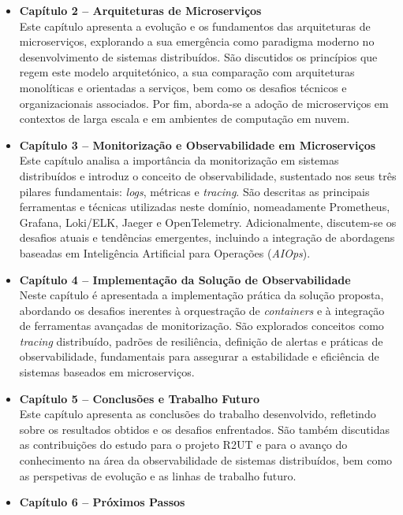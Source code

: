 \begin{itemize}
    \item \textbf{Capítulo 2 – Arquiteturas de Microserviços} \\
    Este capítulo apresenta a evolução e os fundamentos das arquiteturas de microserviços, explorando a sua emergência como paradigma moderno no desenvolvimento de sistemas distribuídos. São discutidos os princípios que regem este modelo arquitetónico, a sua comparação com arquiteturas monolíticas e orientadas a serviços, bem como os desafios técnicos e organizacionais associados. Por fim, aborda-se a adoção de microserviços em contextos de larga escala e em ambientes de computação em nuvem.

    \item \textbf{Capítulo 3 – Monitorização e Observabilidade em Microserviços} \\
    Este capítulo analisa a importância da monitorização em sistemas distribuídos e introduz o conceito de observabilidade, sustentado nos seus três pilares fundamentais: \textit{logs}, métricas e \textit{tracing}. São descritas as principais ferramentas e técnicas utilizadas neste domínio, nomeadamente Prometheus, Grafana, Loki/ELK, Jaeger e OpenTelemetry. Adicionalmente, discutem-se os desafios atuais e tendências emergentes, incluindo a integração de abordagens baseadas em Inteligência Artificial para Operações (\textit{AIOps}).

    \item \textbf{Capítulo 4 – Implementação da Solução de Observabilidade} \\
    Neste capítulo é apresentada a implementação prática da solução proposta, abordando os desafios inerentes à orquestração de \textit{containers} e à integração de ferramentas avançadas de monitorização. São explorados conceitos como \textit{tracing} distribuído, padrões de resiliência, definição de alertas e práticas de observabilidade, fundamentais para assegurar a estabilidade e eficiência de sistemas baseados em microserviços.

    \item \textbf{Capítulo 5 – Conclusões e Trabalho Futuro} \\
    Este capítulo apresenta as conclusões do trabalho desenvolvido, refletindo sobre os resultados obtidos e os desafios enfrentados. São também discutidas as contribuições do estudo para o projeto R2UT e para o avanço do conhecimento na área da observabilidade de sistemas distribuídos, bem como as perspetivas de evolução e as linhas de trabalho futuro.

    \item \textbf{Capítulo 6 – Próximos Passos} \\
    
\end{itemize}
